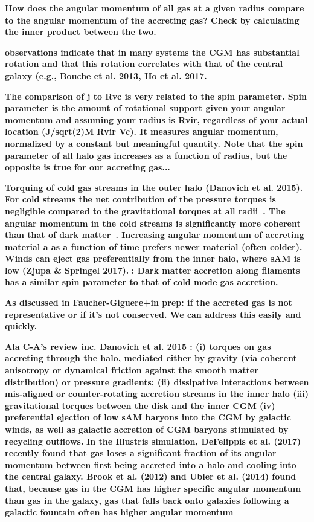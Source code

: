 \documentclass[fleqn,usenatbib]{mnras}
\begin{document}
\textbf{
How does the angular momentum of all gas at a given radius compare to the angular momentum of the accreting gas?
Check by calculating the inner product between the two.
}

\textbf{
observations indicate that in many systems the CGM has substantial rotation and that this rotation correlates with that of the central galaxy (e.g., Bouche et al. 2013, Ho et al. 2017.
}

\textbf{
The comparison of j to Rvc is very related to the spin parameter.
Spin parameter is the amount of rotational support given your angular momentum and assuming your radius is Rvir, regardless of your actual location (J/sqrt(2)M Rvir Vc).
It measures angular momentum, normalized by a constant but meaningful quantity.
Note that the spin parameter of all halo gas increases as a function of radius, but the opposite is true for our accreting gas...
}

\textbf{
Torquing of cold gas streams in the outer halo (Danovich et al. 2015).
For cold streams the net contribution of the pressure torques is negligible compared to the gravitational torques at all radii~\citep{Danovich2015}.
The angular momentum in the cold streams is significantly more coherent than that of dark matter~\citep{Danovich2015}.
Increasing angular momentum of accreting material a as a function of time prefers newer material (often colder).
Winds can eject gas preferentially from the inner halo, where sAM is low (Zjupa \& Springel 2017).
}
\textbf{\cite{Stewart2013}: Dark matter accretion along filaments has a similar spin parameter to that of cold mode gas accretion.}

\textbf{
As discussed in Faucher-Giguere+in prep:
if the accreted gas is not representative or if it's not conserved.
We can address this easily and quickly.
}

\textbf{
Ala C-A's review inc. Danovich et al. 2015 :
(i) torques on gas accreting through the halo, mediated either by gravity (via coherent anisotropy or dynamical friction against the smooth matter distribution) or pressure gradients;
(ii) dissipative interactions between mis-aligned or counter-rotating accretion streams in the inner halo
(iii) gravitational torques between the disk and the inner CGM
(iv) preferential ejection of low sAM baryons into the CGM by galactic winds, as well as galactic accretion of CGM baryons stimulated by recycling outflows.
}
\textbf{
In the Illustris simulation, DeFelippis et al. (2017) recently found that gas loses a significant fraction of its angular momentum between first being accreted into a halo and cooling into the central galaxy. Brook et al. (2012) and Ubler et al. (2014) found that, because gas in the CGM has higher specific angular momentum than gas in the galaxy, gas that falls back onto galaxies following a galactic fountain often has higher angular momentum
}
\end{document}
